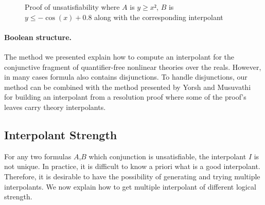 \begin{example}
\begin{figure}
\caption{Proof of unsatisfiability where $A$ is $y≥x²$, $B$ is $y ≤ -\cos(x) + 0.8$ along with the corresponding interpolant}
\label{fig:proof}
\end{figure}
\end{example}

\paragraph{Boolean structure.}
The method we presented explain how to compute an interpolant for the conjunctive fragment of quantifier-free nonlinear theories over the reals.
However, in many cases formula also contains disjunctions.
To handle disjunctions, our method can be combined with the method presented by Yorsh and Musuvathi~\cite{DBLP:conf/cade/YorshM05} for building an interpolant from a resolution proof where some of the proof's leaves carry theory interpolants.

\subsection{Interpolant Strength}

For any two formulas $A$,$B$ which conjunction is unsatisfiable, the interpolant $I$ is not unique.
In practice, it is difficult to know a priori what is a good interpolant.
Therefore, it is desirable to have the possibility of generating and trying multiple interpolants.
We now explain how to get multiple interpolant of different logical strength.

